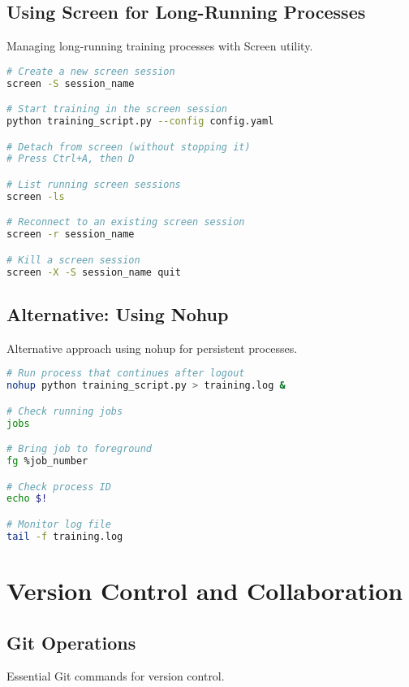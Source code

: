 \documentclass{article}
\begin{document}
\subsection{Using Screen for Long-Running Processes}
Managing long-running training processes with Screen utility.

\begin{tcolorbox}[colback=red!5!white, colframe=red!75!black, title=Screen Session Management]
\begin{lstlisting}[language=bash]
# Create a new screen session
screen -S session_name

# Start training in the screen session
python training_script.py --config config.yaml

# Detach from screen (without stopping it)
# Press Ctrl+A, then D

# List running screen sessions
screen -ls

# Reconnect to an existing screen session
screen -r session_name

# Kill a screen session
screen -X -S session_name quit
\end{lstlisting}
\end{tcolorbox}

\subsection{Alternative: Using Nohup}
Alternative approach using nohup for persistent processes.

\begin{tcolorbox}[colback=red!5!white, colframe=red!75!black, title=Nohup Command for Persistence]
\begin{lstlisting}[language=bash]
# Run process that continues after logout
nohup python training_script.py > training.log &

# Check running jobs
jobs

# Bring job to foreground
fg %job_number

# Check process ID
echo $!

# Monitor log file
tail -f training.log
\end{lstlisting}
\end{tcolorbox}

\section{Version Control and Collaboration}

\subsection{Git Operations}
Essential Git commands for version control.
\end{document}
